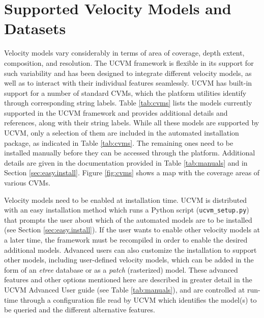 




\section{Supported Velocity Models and Datasets}
\label{sec:cvms}

Velocity models vary considerably in terms of area of coverage, depth extent, composition, and resolution. The UCVM framework is flexible in its support for such variability and has been designed to integrate different velocity models, as well as to interact with their individual features seamlessly. UCVM has built-in support for a number of standard CVMs, which the platform utilities identify through corresponding string labels. Table \ref{tab:cvms} lists the models currently supported in the UCVM framework and provides additional details and references, along with their string labels. While all these models are supported by UCVM, only a selection of them are included in the automated installation package, as indicated in Table \ref{tab:cvms}. The remaining ones need to be installed manually before they can be accessed through the platform. Additional details are given in the documentation provided in Table \ref{tab:manuals} and in Section \ref{sec:easy.install}. Figure \ref{fig:cvms} shows a map with the coverage areas of various CVMs.

Velocity models need to be enabled at installation time. UCVM is distributed with an easy installation method which runs a Python script (\texttt{ucvm\_setup.py}) that prompts the user about which of the automated models are to be installed (see Section \ref{sec:easy.install}). If the user wants to enable other velocity models at a later time, the framework must be recompiled in order to enable the desired additional models. Advanced users can also customize the installation to support other models, including user-defined velocity models, which can be added in the form of an \textit{etree} \citep{Tu_2003_Tech} database or as a \textit{patch} (rasterized) model. These advanced features and other options mentioned here are described in greater detail in the UCVM Advanced User guide (see Table \ref{tab:manuals}), and are controlled at run-time through a configuration file read by UCVM which identifies the model(s) to be queried and the different alternative features.

